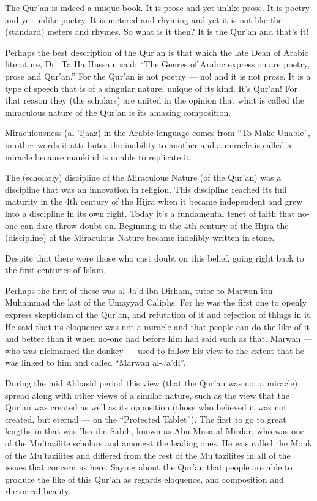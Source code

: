 \documentclass[12pt]{book}
\begin{document}
The Qur’an is indeed a unique book. It is prose and yet unlike prose. It is
poetry and yet unlike poetry. It is metered and rhyming and yet it is not like
the (standard) meters and rhymes. So what is it then? It is the Qur’an and
that’s it!

Perhaps the best description of the Qur’an is that which the late Dean of
Arabic literature, Dr.\ Ta Ha Hussain said: “The Genres of Arabic expression
are poetry, prose and Qur’an.” For the Qur’an is not poetry — no! and it is not
prose. It is a type of speech that is of a singular nature, unique of its kind.
It’s Qur’an! For that reason they (the scholars) are united in the opinion that
what is called the miraculous nature of the Qur’an is its amazing composition.

Miraculousness (al-’Ijaaz) in the Arabic language comes from “To Make Unable”,
in other words it attributes the inability to another and a miracle is called a
miracle because mankind is unable to replicate it.

The (scholarly) discipline of the Miraculous Nature (of the Qur’an) was a
discipline that was an innovation in religion. This discipline reached its full
maturity in the 4th century of the Hijra when it became independent and grew
into a discipline in its own right. Today it’s a fundamental tenet of faith
that no-one can dare throw doubt on. Beginning in the 4th century of the Hijra
the (discipline) of the Miraculous Nature became indelibly written in stone.

Despite that there were those who cast doubt on this belief, going right back
to the first centuries of Islam.

Perhaps the first of these was al-Ja’d ibn Dirham, tutor to Marwan ibn Muhammad
the last of the Umayyad Caliphs. For he was the first one to openly express
skepticism of the Qur’an, and refutation of it and rejection of things in it.
He said that its eloquence was not a miracle and that people can do the like of
it and better than it when no-one had before him had said such as that. Marwan
— who was nicknamed the donkey — used to follow his view to the extent that he
was linked to him and called “Marwan al-Ja’di”\footnotemark.


During the mid Abbasid period this view (that the Qur’an was not a miracle)
spread along with other views of a similar nature, such as the view that the
Qur’an was created as well as its opposition (those who believed it was not
created, but eternal — on the “Protected Tablet”). The first to go to great
lengths in that was ’Isa ibn Sabih, known as Abu Musa al Mirdar, who was one of
the Mu’tazilite scholars and amongst the leading ones. He was called the Monk
of the Mu’tazilites and differed from the rest of the Mu’tazilites in all of
the issues that concern us here. Saying about the Qur’an that people are able
to produce the like of this Qur’an as regards eloquence, and composition and
rhetorical beauty\footnotemark.
\end{document}
